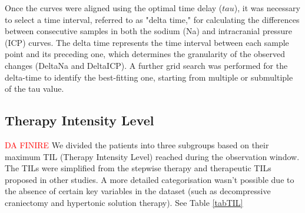 Once the curves were aligned using the optimal time delay ($tau$), it was necessary to select a time interval, referred to as "delta time," for calculating the differences between consecutive samples in both the sodium (Na) and intracranial pressure (ICP) curves. The delta time represents the time interval between each sample point and its preceding one, which determines the granularity of the observed changes (DeltaNa and DeltaICP). 
A further grid search was performed for the delta-time to identify the best-fitting one, starting from multiple or submultiple of the tau value.

\subsection{Therapy Intensity Level}
\textcolor{red}{DA FINIRE}
We  divided the patients into three subgroups based on their maximum TIL (Therapy Intensity Level) reached during the observation window. The TILs were simplified from the stepwise therapy and therapeutic TILs proposed in other studies. A more detailed categorisation wasn’t possible due to the absence of certain key variables in the dataset (such as decompressive craniectomy and hypertonic solution therapy). See Table \ref{tabTIL}


